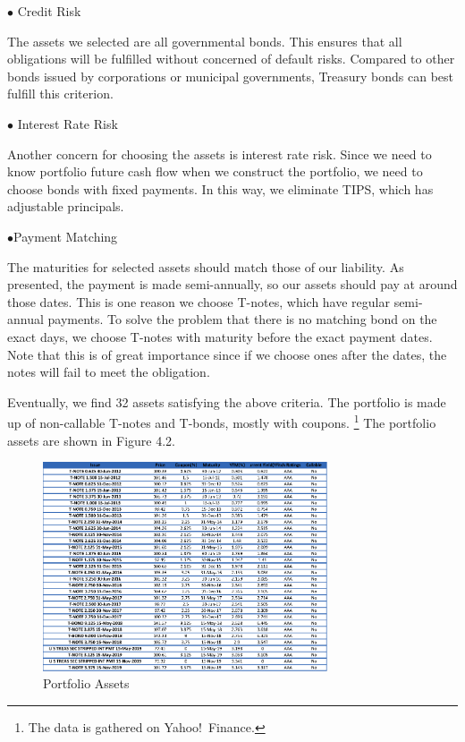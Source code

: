 \documentclass[oneside,12pt]{report}
\begin{document}
\noindent $\bullet$ Credit Risk

\noindent The assets we selected are all governmental bonds. This ensures that all obligations will be fulfilled without concerned of default risks. Compared to other bonds issued by corporations or municipal governments, Treasury bonds can best fulfill this criterion.

$\bullet$ Interest Rate Risk

Another concern for choosing the assets is interest rate risk. Since we need to know portfolio future cash flow when we construct the portfolio, we need to choose bonds with fixed payments. In this way, we eliminate TIPS, which has adjustable principals. 

$\bullet$Payment Matching

The maturities for selected assets should match those of our liability. As presented, the payment is made semi-annually, so our assets should pay at around those dates. This is one reason we choose T-notes, which have regular semi-annual payments. To solve the problem that there is no matching bond on the exact days, we choose T-notes with maturity before the exact payment dates. Note that this is of great importance since if we choose ones after the dates, the notes will fail to meet the obligation.

Eventually, we find 32 assets satisfying the above criteria. The portfolio is made up of non-callable T-notes and T-bonds, mostly with coupons. \footnote{The data is gathered on Yahoo!~Finance.} The portfolio assets are shown in Figure 4.2.

\begin{figure}[htb]
    \begin{center}
        \includegraphics[width=0.75\textwidth]{finance.png}
    \end{center}
    \caption{Portfolio Assets}
\end{figure}
\end{document}
